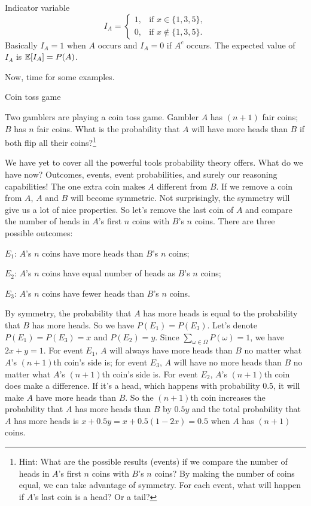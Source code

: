 \begin{concept}{Indicator variable}
\[
I_A=\begin{cases}
1, & \text{if }x\in\{1,3,5\},\\
0, & \text{if }x\notin\{1,3,5\}.
\end{cases}
\]
Basically $I_A=1$ when $A$ occurs and $I_A=0$ if $A^c$ occurs. The expected value of
$I_A$ is \(\mathbb{E}[I_A]=P(A)\).
\end{concept}

Now, time for some examples.

\begin{problem}{Coin toss game}

Two gamblers are playing a coin toss game. Gambler $A$ has $(n+1)$ fair coins; $B$ has
$n$ fair coins. What is the probability that $A$ will have more heads than $B$ if both flip all
their coins?\footnote[2]{Hint: What are the possible results (events) if we compare the number
of heads in $A$'s first $n$ coins with $B$'s $n$ coins? By making the number of coins equal,
we can take advantage of symmetry. For each event, what will happen if $A$'s last coin is a
head? Or a tail?}
\end{problem}

\begin{solution}
We have yet to cover all the powerful tools probability theory offers. What do we have now?
Outcomes, events, event probabilities, and surely our reasoning capabilities! The one extra
coin makes $A$ different from $B$. If we remove a coin from $A$, $A$ and $B$ will become
symmetric. Not surprisingly, the symmetry will give us a lot of nice properties. So let's
remove the last coin of $A$ and compare the number of heads in $A$'s first $n$ coins with
$B$'s $n$ coins. There are three possible outcomes:

\noindent $E_1$: $A$'s $n$ coins have more heads than $B$'s $n$ coins;

\noindent $E_2$: $A$'s $n$ coins have equal number of heads as $B$'s $n$ coins;

\noindent $E_3$: $A$'s $n$ coins have fewer heads than $B$'s $n$ coins.

By symmetry, the probability that $A$ has more heads is equal to the probability that $B$
has more heads. So we have $P(E_1)=P(E_3)$. Let's denote $P(E_1)=P(E_3)=x$ and
$P(E_2)=y$. Since $\sum_{\omega\in\Omega}P(\omega)=1$, we have $2x+y=1$. For
event $E_1$, $A$ will always have more heads than $B$ no matter what $A$'s $(n+1)$th
coin's side is; for event $E_3$, $A$ will have no more heads than $B$ no matter what
$A$'s $(n+1)$th coin's side is. For event $E_2$, $A$'s $(n+1)$th coin does make a
difference. If it's a head, which happens with probability 0.5, it will make $A$ have more
heads than $B$. So the $(n+1)$th coin increases the probability that $A$ has more heads
than $B$ by $0.5y$ and the total probability that $A$ has more heads is
$x+0.5y=x+0.5(1-2x)=0.5$ when $A$ has $(n+1)$ coins.\qedhere
\end{solution}

